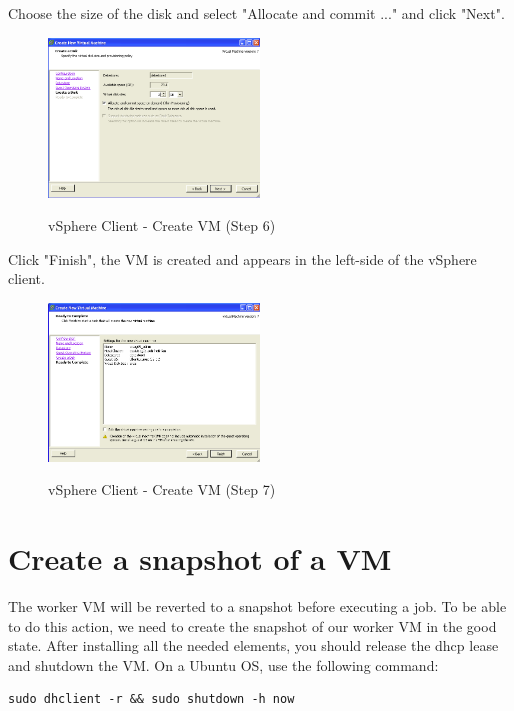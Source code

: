 \pagebreak
Choose the size of the disk and select "Allocate and commit ..." and click "Next".
\begin{figure}[ht]
	\caption{vSphere Client - Create VM (Step 6)}
  	\centering
	\includegraphics[width=0.5\textwidth]{./pic/createvm_6.png}
	\label{fig:createvm_6}
\end{figure}

Click "Finish", the VM is created and appears in the left-side of the vSphere client. 
\begin{figure}[ht]
	\caption{vSphere Client - Create VM (Step 7)}
  	\centering
	\includegraphics[width=0.5\textwidth]{./pic/createvm_7.png}
	\label{fig:createvm_7}
\end{figure}


\pagebreak
\section{Create a snapshot of a VM}
\label{app:snap}
The worker VM will be reverted to a snapshot before executing a job. To be able to do this action, we need to create the snapshot of our worker VM in the good state. After installing all the needed elements, you should release the dhcp lease and shutdown the VM. On a Ubuntu OS, use the following command:\s

\begin{lstlisting}
sudo dhclient -r && sudo shutdown -h now
\end{lstlisting}\s


